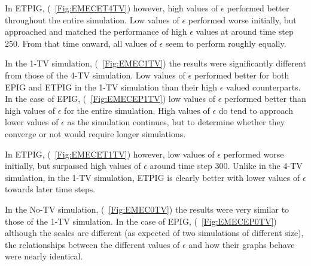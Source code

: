 \documentclass[12pt]{thesis}
\begin{document}
In ETPIG, (\figurename~\ref{Fig:EMECET4TV}) however, high values of $\epsilon$ performed better throughout the entire simulation. Low values of $\epsilon$ performed worse initially, but approached and matched the performance of high $\epsilon$ values at around time step 250. From that time onward, all values of $\epsilon$ seem to perform roughly equally.

In the 1-TV simulation, (\figurename~\ref{Fig:EMEC1TV}) the results were significantly different from those of the 4-TV simulation. Low values of $\epsilon$ performed better for both EPIG and ETPIG in the 1-TV simulation than their high $\epsilon$ valued counterparts. In the case of EPIG, (\figurename~\ref{Fig:EMECEP1TV}) low values of $\epsilon$ performed better than high values of $\epsilon$ for the entire simulation. High values of $\epsilon$ do tend to approach lower values of $\epsilon$ as the simulation continues, but to determine whether they converge or not would require longer simulations.

In ETPIG, (\figurename~\ref{Fig:EMECET1TV}) however, low values of $\epsilon$ performed worse initially, but surpassed high values of $\epsilon$ around time step 300. Unlike in the 4-TV simulation, in the 1-TV simulation, ETPIG is clearly better with lower values of $\epsilon$ towards later time steps.

In the No-TV simulation, (\figurename~\ref{Fig:EMEC0TV}) the results were very similar to those of the 1-TV simulation. In the case of EPIG, (\figurename~\ref{Fig:EMECEP0TV}) although the scales are different (as expected of two simulations of different size), the relationships between the different values of $\epsilon$ and how their graphs behave were nearly identical.
\end{document}
